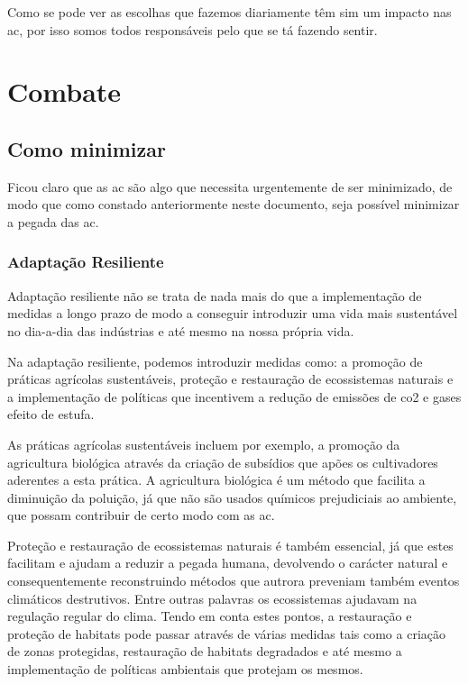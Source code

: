 \documentclass{report}
\begin{document}
Como se pode ver as escolhas que fazemos diariamente têm sim um impacto nas \ac{ac}, por isso somos todos responsáveis pelo que se tá fazendo sentir.


\chapter{Combate}
\label{chap.analise}

\section{Como minimizar}

Ficou claro que as \ac{ac} são algo que necessita urgentemente de ser minimizado, de modo que como constado anteriormente neste documento, seja possível minimizar a pegada das \ac{ac}.  

\subsection{Adaptação Resiliente}

Adaptação resiliente não se trata de nada mais do que a implementação de medidas a longo prazo de modo a conseguir introduzir uma vida mais sustentável no dia-a-dia das indústrias e até mesmo na nossa própria vida.

Na adaptação resiliente, podemos introduzir medidas como: a promoção de práticas agrícolas sustentáveis, proteção e restauração de ecossistemas naturais e a implementação de políticas que incentivem a redução de emissões de \ac{co2} e gases efeito de estufa.

As práticas agrícolas sustentáveis incluem por exemplo, a promoção da agricultura biológica através da criação de subsídios que apões os cultivadores aderentes a esta prática. A agricultura biológica é um método que facilita a diminuição da poluição, já que não são usados químicos prejudiciais ao ambiente, que possam contribuir de certo modo com as \ac{ac}.

Proteção e restauração de ecossistemas naturais é também essencial, já que estes facilitam e ajudam a reduzir a pegada humana, devolvendo o carácter natural e consequentemente reconstruindo métodos que autrora preveniam também eventos climáticos destrutivos. Entre outras palavras os ecossistemas ajudavam na regulação regular do clima. Tendo em conta estes pontos, a restauração e proteção de habitats pode passar através de várias medidas tais como a criação de zonas protegidas, restauração de habitats degradados e até mesmo a implementação de políticas ambientais que protejam os mesmos.
\end{document}
